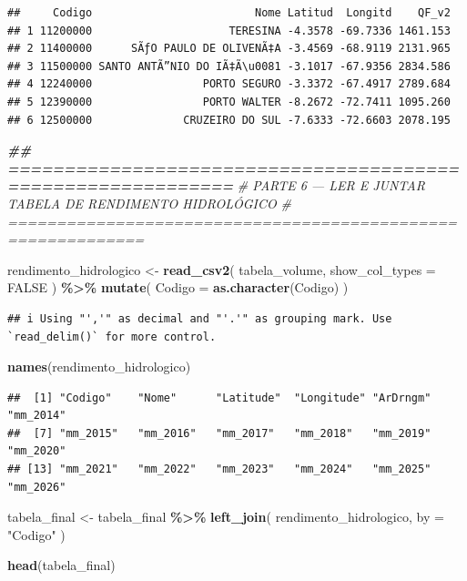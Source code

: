 \documentclass[
]{article}
\newenvironment{Shaded}{\begin{snugshade}}{\end{snugshade}}
\newcommand{\AttributeTok}[1]{\textcolor[rgb]{0.13,0.29,0.53}{#1}}
\newcommand{\CommentTok}[1]{\textcolor[rgb]{0.56,0.35,0.01}{\textit{#1}}}
\newcommand{\ConstantTok}[1]{\textcolor[rgb]{0.56,0.35,0.01}{#1}}
\newcommand{\DocumentationTok}[1]{\textcolor[rgb]{0.56,0.35,0.01}{\textbf{\textit{#1}}}}
\newcommand{\FunctionTok}[1]{\textcolor[rgb]{0.13,0.29,0.53}{\textbf{#1}}}
\newcommand{\NormalTok}[1]{#1}
\newcommand{\OtherTok}[1]{\textcolor[rgb]{0.56,0.35,0.01}{#1}}
\newcommand{\SpecialCharTok}[1]{\textcolor[rgb]{0.81,0.36,0.00}{\textbf{#1}}}
\newcommand{\StringTok}[1]{\textcolor[rgb]{0.31,0.60,0.02}{#1}}
\begin{document}
\begin{verbatim}
##     Codigo                         Nome Latitud  Longitd    QF_v2
## 1 11200000                     TERESINA -4.3578 -69.7336 1461.153
## 2 11400000      SÃƒO PAULO DE OLIVENÃ‡A -3.4569 -68.9119 2131.965
## 3 11500000 SANTO ANTÃ”NIO DO IÃ‡Ã\u0081 -3.1017 -67.9356 2834.586
## 4 12240000                 PORTO SEGURO -3.3372 -67.4917 2789.684
## 5 12390000                 PORTO WALTER -8.2672 -72.7411 1095.260
## 6 12500000              CRUZEIRO DO SUL -7.6333 -72.6603 2078.195
\end{verbatim}

\begin{Shaded}
\begin{Highlighting}[]
\DocumentationTok{\#\# ============================================================}
\CommentTok{\# PARTE 6 — LER E JUNTAR TABELA DE RENDIMENTO HIDROLÓGICO}
\CommentTok{\# ============================================================}

\NormalTok{rendimento\_hidrologico }\OtherTok{\textless{}{-}} \FunctionTok{read\_csv2}\NormalTok{(}
\NormalTok{  tabela\_volume,}
  \AttributeTok{show\_col\_types =} \ConstantTok{FALSE}
\NormalTok{) }\SpecialCharTok{\%\textgreater{}\%}
  \FunctionTok{mutate}\NormalTok{(}
    \AttributeTok{Codigo =} \FunctionTok{as.character}\NormalTok{(Codigo)}
\NormalTok{  )}
\end{Highlighting}
\end{Shaded}

\begin{verbatim}
## i Using "','" as decimal and "'.'" as grouping mark. Use `read_delim()` for more control.
\end{verbatim}

\begin{Shaded}
\begin{Highlighting}[]
\FunctionTok{names}\NormalTok{(rendimento\_hidrologico)}
\end{Highlighting}
\end{Shaded}

\begin{verbatim}
##  [1] "Codigo"    "Nome"      "Latitude"  "Longitude" "ArDrngm"   "mm_2014"  
##  [7] "mm_2015"   "mm_2016"   "mm_2017"   "mm_2018"   "mm_2019"   "mm_2020"  
## [13] "mm_2021"   "mm_2022"   "mm_2023"   "mm_2024"   "mm_2025"   "mm_2026"
\end{verbatim}

\begin{Shaded}
\begin{Highlighting}[]
\NormalTok{tabela\_final }\OtherTok{\textless{}{-}}\NormalTok{ tabela\_final }\SpecialCharTok{\%\textgreater{}\%}
  \FunctionTok{left\_join}\NormalTok{(}
\NormalTok{    rendimento\_hidrologico,}
    \AttributeTok{by =} \StringTok{"Codigo"}
\NormalTok{  )}

\FunctionTok{head}\NormalTok{(tabela\_final)}
\end{Highlighting}
\end{Shaded}
\end{document}
